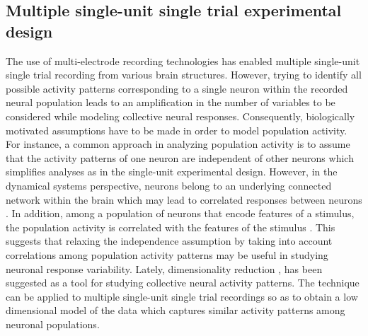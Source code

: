 \subsection{Multiple single-unit single trial experimental design}
The use of multi-electrode \cite{Kipke2008} recording technologies has enabled  multiple single-unit single trial recording from various brain structures. However, trying to identify all possible activity patterns  corresponding to  a single neuron within the recorded neural population leads to an amplification in the number of variables to be considered while modeling collective neural responses. Consequently, biologically motivated assumptions have to be made in order to model population activity. For instance, a common approach in analyzing population activity is to assume that the activity patterns of one neuron are independent of other neurons which simplifies  analyses as in the single-unit experimental design. However, in the dynamical systems perspective, neurons belong to an underlying connected network within the brain  which may lead to correlated responses between neurons \cite{Shenoy2013}. In addition, among a population of neurons that encode features of a stimulus, the population activity is correlated with the features of the stimulus \cite{Georgopoulos1982, Hubel1968}. This suggests that relaxing the independence assumption by
taking into account correlations among population activity patterns may be useful in studying neuronal response
variability. Lately, dimensionality reduction \cite{Cunningham2014a}, has been suggested as a tool for studying collective neural activity patterns. The technique can be applied to multiple single-unit single trial recordings so as to obtain a low dimensional model of the data which captures similar activity patterns among neuronal populations.\\

